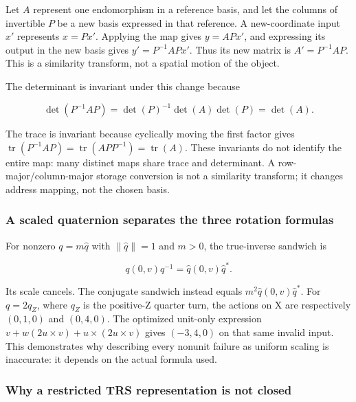 \hypertarget{02-foundations-ii-ch039-a-change-of-basis-changes-a-map-on-both-sides}{}

Let \(A\) represent one endomorphism in a reference basis, and let the columns of invertible \(P\) be a new basis expressed in that reference. A new-coordinate input \(x'\) represents \(x=Px'\). Applying the map gives \(y=APx'\), and expressing its output in the new basis gives \(y'=P^{-1}APx'\). Thus its new matrix is \(A'=P^{-1}AP\). This is a similarity transform, not a spatial motion of the object.

The determinant is invariant under this change because

\[
\det(P^{-1}AP)=\det(P)^{-1}\det(A)\det(P)=\det(A).
\]

The trace is invariant because cyclically moving the first factor gives \(\operatorname{tr}(P^{-1}AP)=\operatorname{tr}(APP^{-1})=\operatorname{tr}(A)\). These invariants do not identify the entire map: many distinct maps share trace and determinant. A row-major/column-major storage conversion is not a similarity transform; it changes address mapping, not the chosen basis.

\subsubsection{A scaled quaternion separates the three rotation formulas}\label{02-foundations-ii-ch039-a-scaled-quaternion-separates-the-three-rotation-formulas}

\hypertarget{02-foundations-ii-ch039-a-scaled-quaternion-separates-the-three-rotation-formulas}{}

For nonzero \(q=m\widehat q\) with \(\|\widehat q\|=1\) and \(m>0\), the true-inverse sandwich is

\[
q(0,v)q^{-1}=\widehat q(0,v)\widehat q^*.
\]

Its scale cancels. The conjugate sandwich instead equals \(m^2\widehat q(0,v)\widehat q^*\). For \(q=2q_Z\), where \(q_Z\) is the positive-Z quarter turn, the actions on X are respectively \((0,1,0)\) and \((0,4,0)\). The optimized unit-only expression \(v+w(2u\times v)+u\times(2u\times v)\) gives \((-3,4,0)\) on that same invalid input. This demonstrates why describing every nonunit failure as uniform scaling is inaccurate: it depends on the actual formula used.

\subsubsection{Why a restricted TRS representation is not closed}\label{02-foundations-ii-ch039-why-a-restricted-trs-representation-is-not-closed}

